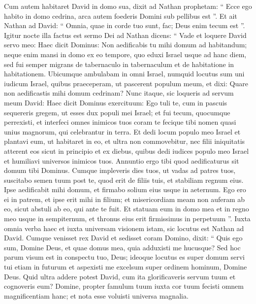 \begin{biblechapter}
\begin{biblechapter}
\begin{biblechapter}
\begin{biblechapter}
\begin{biblechapter}
\begin{biblechapter}
\begin{biblechapter}
\begin{biblechapter}
\begin{biblechapter}
\begin{biblechapter}
\begin{biblechapter}
\begin{biblechapter}
\begin{biblechapter}
\begin{biblechapter}
\begin{biblechapter}
\begin{biblechapter}
\begin{biblechapter}
\verse Cum autem habitaret David in domo sua, dixit ad Nathan prophetam: “ Ecce ego habito in domo cedrina, arca autem foederis Domini sub pellibus est ”. 
\verse Et ait Nathan ad David: “ Omnia, quae in corde tuo sunt, fac; Deus enim tecum est ”.
 \verse Igitur nocte illa factus est sermo Dei ad Nathan dicens: 
\verse “ Vade et loquere David servo meo: Haec dicit Dominus: Non aedificabis tu mihi domum ad habitandum; 
\verse neque enim mansi in domo ex eo tempore, quo eduxi Israel usque ad hanc diem, sed fui semper migrans de tabernaculo in tabernaculum et de habitatione in habitationem. 
\verse Ubicumque ambulabam in omni Israel, numquid locutus sum uni iudicum Israel, quibus praeceperam, ut pascerent populum meum, et dixi: Quare non aedificastis mihi domum cedrinam? 
\verse Nunc itaque, sic loqueris ad servum meum David: Haec dicit Dominus exercituum: Ego tuli te, cum in pascuis sequereris gregem, ut esses dux populi mei Israel; 
\verse et fui tecum, quocumque perrexisti, et interfeci omnes inimicos tuos coram te fecique tibi nomen quasi unius magnorum, qui celebrantur in terra. 
\verse Et dedi locum populo meo Israel et plantavi eum, ut habitaret in eo, et ultra non commovebitur, nec filii iniquitatis atterent eos sicut in principio 
\verse et ex diebus, quibus dedi iudices populo meo Israel et humiliavi universos inimicos tuos. Annuntio ergo tibi quod aedificaturus sit domum tibi Dominus. 
\verse Cumque impleveris dies tuos, ut vadas ad patres tuos, suscitabo semen tuum post te, quod erit de filiis tuis, et stabiliam regnum eius. 
\verse Ipse aedificabit mihi domum, et firmabo solium eius usque in aeternum. 
\verse Ego ero ei in patrem, et ipse erit mihi in filium; et misericordiam meam non auferam ab eo, sicut abstuli ab eo, qui ante te fuit. 
\verse Et statuam eum in domo mea et in regno meo usque in sempiternum, et thronus eius erit firmissimus in perpetuum ”.
 \verse Iuxta omnia verba haec et iuxta universam visionem istam, sic locutus est Nathan ad David.
 \verse Cumque venisset rex David et sedisset coram Domino, dixit: “ Quis ego sum, Domine Deus, et quae domus mea, quia adduxisti me hucusque? 
\verse Sed hoc parum visum est in conspectu tuo, Deus; ideoque locutus es super domum servi tui etiam in futurum et aspexisti me excelsum super ordinem hominum, Domine Deus. 
\verse Quid ultra addere potest David, cum ita glorificaveris servum tuum et cognoveris eum? 
\verse Domine, propter famulum tuum iuxta cor tuum fecisti omnem magnificentiam hanc; et nota esse voluisti universa magnalia. 

\end{biblechapter}
\end{biblechapter}
\end{biblechapter}
\end{biblechapter}
\end{biblechapter}
\end{biblechapter}
\end{biblechapter}
\end{biblechapter}
\end{biblechapter}
\end{biblechapter}
\end{biblechapter}
\end{biblechapter}
\end{biblechapter}
\end{biblechapter}
\end{biblechapter}
\end{biblechapter}
\end{biblechapter}
